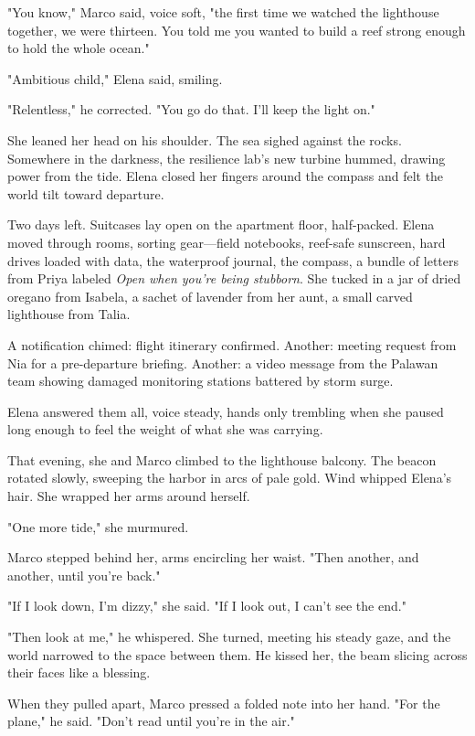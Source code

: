 "You know," Marco said, voice soft, "the first time we watched the lighthouse together, we were thirteen. You told me you wanted to build a reef strong enough to hold the whole ocean."

"Ambitious child," Elena said, smiling.

"Relentless," he corrected. "You go do that. I'll keep the light on."

She leaned her head on his shoulder. The sea sighed against the rocks. Somewhere in the darkness, the resilience lab's new turbine hummed, drawing power from the tide. Elena closed her fingers around the compass and felt the world tilt toward departure.

\bigskip

Two days left. Suitcases lay open on the apartment floor, half-packed. Elena moved through rooms, sorting gear—field notebooks, reef-safe sunscreen, hard drives loaded with data, the waterproof journal, the compass, a bundle of letters from Priya labeled \textit{Open when you're being stubborn}. She tucked in a jar of dried oregano from Isabela, a sachet of lavender from her aunt, a small carved lighthouse from Talia.

A notification chimed: flight itinerary confirmed. Another: meeting request from Nia for a pre-departure briefing. Another: a video message from the Palawan team showing damaged monitoring stations battered by storm surge.

Elena answered them all, voice steady, hands only trembling when she paused long enough to feel the weight of what she was carrying.

That evening, she and Marco climbed to the lighthouse balcony. The beacon rotated slowly, sweeping the harbor in arcs of pale gold. Wind whipped Elena's hair. She wrapped her arms around herself.

"One more tide," she murmured.

Marco stepped behind her, arms encircling her waist. "Then another, and another, until you're back."

"If I look down, I'm dizzy," she said. "If I look out, I can't see the end."

"Then look at me," he whispered. She turned, meeting his steady gaze, and the world narrowed to the space between them. He kissed her, the beam slicing across their faces like a blessing.

When they pulled apart, Marco pressed a folded note into her hand. "For the plane," he said. "Don't read until you're in the air."

